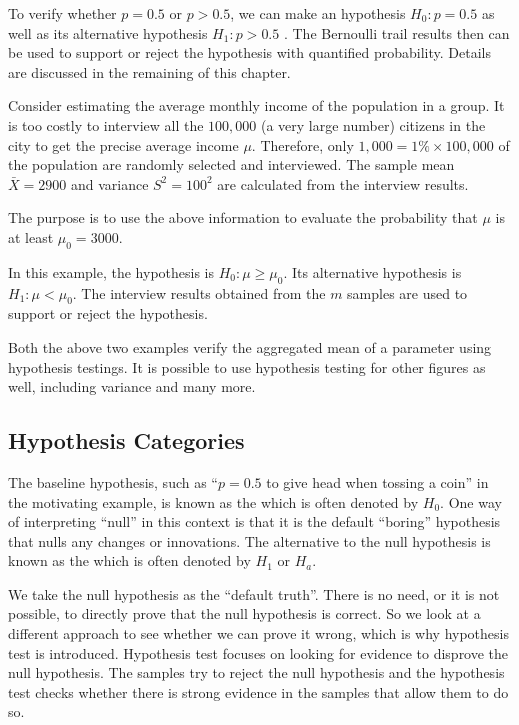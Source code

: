 To verify whether $p=0.5$ or $p>0.5$, we can make an hypothesis $H_0:p=0.5$ as well as its alternative hypothesis $H_1:p>0.5$ . The Bernoulli trail results then can be used to support or reject the hypothesis with quantified probability. Details are discussed in the remaining of this chapter. 

\begin{shortbox}

Consider estimating the average monthly income of the population in a group. It is too costly to interview all the $100,000$ (a very large number) citizens in the city to get the precise average income $\mu$. Therefore, only $1,000 = 1\%\times 100,000$ of the population are randomly selected and interviewed. The sample mean $\bar{X} = 2900$ and variance $S^2=100^2$ are calculated from the interview results.

The purpose is to use the above information to evaluate the probability that $\mu$ is at least $\mu_0=3000$. 

\end{shortbox}

In this example, the hypothesis is $H_0: \mu \geq \mu_0$. Its alternative hypothesis is $H_1: \mu<\mu_0$. The interview results obtained from the $m$ samples are used to support or reject the hypothesis.

Both the above two examples verify the aggregated mean of a parameter using hypothesis testings. It is possible to use hypothesis testing for other figures as well, including variance and many more.

\subsection{Hypothesis Categories}

The baseline hypothesis, such as ``$p=0.5$ to give head when tossing a coin'' in the motivating example, is known as the  which is often denoted by $H_0$. One way of interpreting ``null'' in this context is that it is the default ``boring'' hypothesis that nulls any changes or innovations. The alternative to the null hypothesis is known as the  which is often denoted by $H_1$ or $H_a$.

We take the null hypothesis as the ``default truth''. There is no need, or it is not possible, to directly prove that the null hypothesis is correct. So we look at a different approach to see whether we can prove it wrong, which is why hypothesis test is introduced. Hypothesis test focuses on looking for evidence to disprove the null hypothesis. The samples try to reject the null hypothesis and the hypothesis test checks whether there is strong evidence in the samples that allow them to do so.

